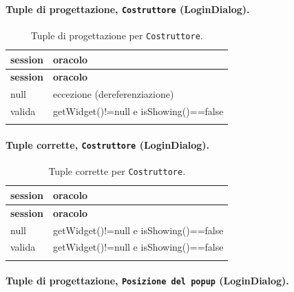 \paragraph*{Tuple di progettazione, \texttt{Costruttore} (LoginDialog).}

{\footnotesize\setlength{\tabcolsep}{3pt}
\begin{longtable}{>{\raggedright\arraybackslash}p{}>{\raggedright\arraybackslash}p{}}
\toprule
\textbf{session} & \textbf{oracolo} \\
\midrule
\endfirsthead
\toprule
\textbf{session} & \textbf{oracolo} \\
\midrule
\endhead
\bottomrule
\endfoot
null & eccezione (dereferenziazione) \\
valida & getWidget()!=null e isShowing()==false \\
\bottomrule
\caption{Tuple di progettazione per \texttt{Costruttore}.}
\label{tab:logindialog-costruttore-tuple}
\end{longtable}
}



\paragraph*{Tuple corrette, \texttt{Costruttore} (LoginDialog).}

{\footnotesize\setlength{\tabcolsep}{3pt}
\begin{longtable}{>{\raggedright\arraybackslash}p{}>{\raggedright\arraybackslash}p{}}
\toprule
\textbf{session} & \textbf{oracolo} \\
\midrule
\endfirsthead
\toprule
\textbf{session} & \textbf{oracolo} \\
\midrule
\endhead
\bottomrule
\endfoot
null & getWidget()!=null e isShowing()==false \\
valida & getWidget()!=null e isShowing()==false \\
\bottomrule
\caption{Tuple corrette per \texttt{Costruttore}.}
\label{tab:logindialog-costruttore-tuple-corrette}
\end{longtable}
}



\paragraph*{Tuple di progettazione, \texttt{Posizione del popup} (LoginDialog).}

